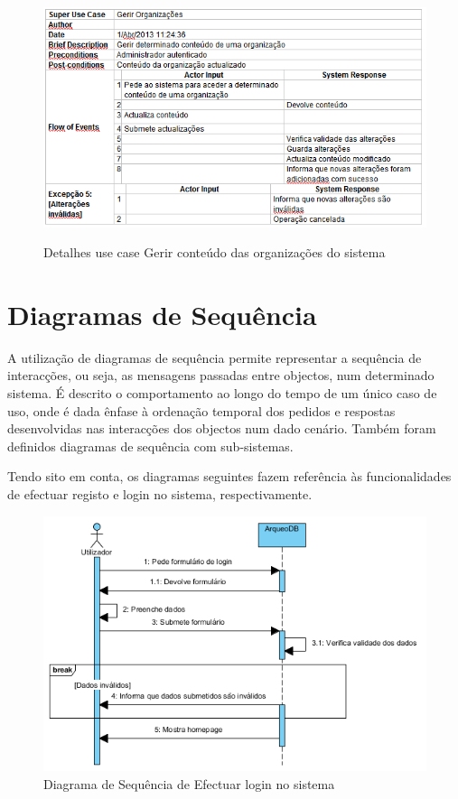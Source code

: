 \documentclass[12pt,a4paper]{article}
\begin{document}
\begin{figure}[h!]
\centering
\includegraphics[scale=0.7]{d_usecase/A_gerirconteudo}
\label{usecase}
\caption{Detalhes use case Gerir conteúdo das organizações do sistema} 
\end{figure}


\clearpage
\section{Diagramas de Sequência}
A utilização de diagramas de sequência permite representar a sequência de interacções, ou
seja, as mensagens passadas entre objectos, num determinado sistema. É descrito o comportamento
ao longo do tempo de um único caso de uso, onde é dada ênfase à ordenação temporal dos pedidos e respostas desenvolvidas nas interacções dos objectos num dado cenário. Também foram definidos diagramas de sequência com sub-sistemas.

Tendo sito em conta, os diagramas seguintes fazem referência às funcionalidades de efectuar registo e login no sistema, respectivamente.\\

\begin{figure}[h!]
\centering
\includegraphics[scale=1]{sequencia/login}
\caption{Diagrama de Sequência de Efectuar login no sistema} 
\end{figure}
\end{document}
